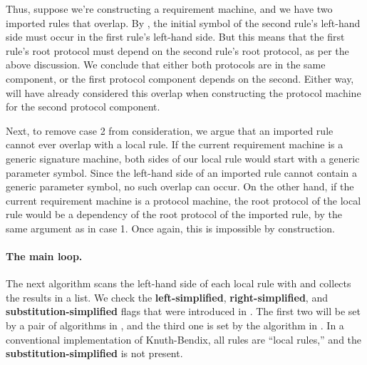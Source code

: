 \documentclass[../generics]{subfiles}
\begin{document}
Thus, suppose we're constructing a requirement machine, and we have two imported rules that overlap. By , the initial symbol of the second rule's left-hand side must occur in the first rule's left-hand side. But this means that the first rule's root protocol must depend on the second rule's root protocol, as per the above discussion. We conclude that either both protocols are in the same component, or the first protocol component depends on the second. Either way, will have already considered this overlap when constructing the protocol machine for the second protocol component.

Next, to remove case 2 from consideration, we argue that an imported rule cannot ever overlap with a local rule. If the current requirement machine is a generic signature machine, both sides of our local rule would start with a generic parameter symbol. Since the left-hand side of an imported rule cannot contain a generic parameter symbol, no such overlap can occur. On the other hand, if the current requirement machine is a protocol machine, the root protocol of the local rule would be a dependency of the root protocol of the imported rule, by the same argument as in case 1. Once again, this is impossible by construction.

\paragraph{The main loop.}
The next algorithm scans the left-hand side of each local rule with  and collects the results in a list. We check the \textbf{left-simplified}, \textbf{right-simplified}, and \textbf{substitution-simplified} flags that were introduced in . The first two will be set by a pair of algorithms in , and the third one is set by the algorithm in . In a conventional implementation of Knuth-Bendix, all rules are ``local rules,'' and the \textbf{substitution-simplified} is not present.
\end{document}

